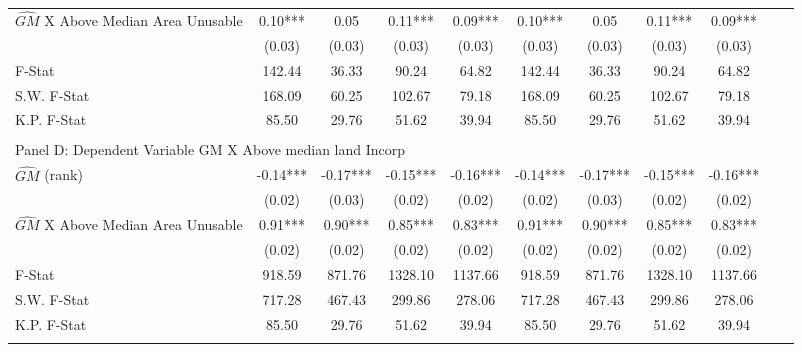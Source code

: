 \begin{table}[htbp]
\begin{threeparttable}
\begin{tabular}{l*{10}{c}}
\addlinespace
$\hat{GM}$ X Above Median Area Unusable&       0.10***&       0.05   &       0.11***&       0.09***&       0.10***&       0.05   &       0.11***&       0.09***\\
                &     (0.03)   &     (0.03)   &     (0.03)   &     (0.03)   &     (0.03)   &     (0.03)   &     (0.03)   &     (0.03)   \\
\midrule
F-Stat          &     142.44   &      36.33   &      90.24   &      64.82   &     142.44   &      36.33   &      90.24   &      64.82   \\
S.W. F-Stat     &     168.09   &      60.25   &     102.67   &      79.18   &     168.09   &      60.25   &     102.67   &      79.18   \\
K.P. F-Stat     &      85.50   &      29.76   &      51.62   &      39.94   &      85.50   &      29.76   &      51.62   &      39.94   \\
\cmidrule[\heavyrulewidth](lr){1-9} \\ \cmidrule[\heavyrulewidth](lr){1-9}
\multicolumn{8}{l}{Panel D: Dependent Variable GM X Above median land Incorp}\\
\cmidrule(lr){1-9}
$\hat{GM}$ (rank)&      -0.14***&      -0.17***&      -0.15***&      -0.16***&      -0.14***&      -0.17***&      -0.15***&      -0.16***\\
                &     (0.02)   &     (0.03)   &     (0.02)   &     (0.02)   &     (0.02)   &     (0.03)   &     (0.02)   &     (0.02)   \\
\addlinespace
$\hat{GM}$ X Above Median Area Unusable&       0.91***&       0.90***&       0.85***&       0.83***&       0.91***&       0.90***&       0.85***&       0.83***\\
                &     (0.02)   &     (0.02)   &     (0.02)   &     (0.02)   &     (0.02)   &     (0.02)   &     (0.02)   &     (0.02)   \\
\midrule
F-Stat          &     918.59   &     871.76   &    1328.10   &    1137.66   &     918.59   &     871.76   &    1328.10   &    1137.66   \\
S.W. F-Stat     &     717.28   &     467.43   &     299.86   &     278.06   &     717.28   &     467.43   &     299.86   &     278.06   \\
K.P. F-Stat     &      85.50   &      29.76   &      51.62   &      39.94   &      85.50   &      29.76   &      51.62   &      39.94   \\
\cmidrule[\heavyrulewidth](lr){1-9} \\ \cmidrule[\heavyrulewidth](lr){1-9}

\end{tabular}
\end{threeparttable}
\end{table}
